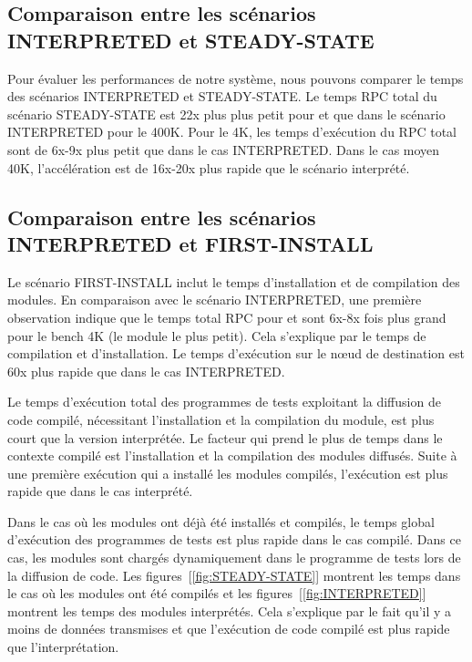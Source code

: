 \subsection{Comparaison entre les scénarios INTERPRETED et STEADY-STATE}

Pour évaluer les performances de notre système, nous pouvons comparer le temps
des scénarios INTERPRETED et STEADY-STATE. Le temps RPC total du scénario
STEADY-STATE est 22x plus plus petit pour \MMM[x86/macOS] et 
que dans le scénario INTERPRETED pour le 400K. Pour le 4K, les temps
d'exécution du RPC total sont de 6x-9x plus petit que dans le cas INTERPRETED.
Dans le cas moyen 40K, l'accélération est de 16x-20x plus rapide que le
scénario interprété.

\subsection{Comparaison entre les scénarios INTERPRETED et FIRST-INSTALL}

Le scénario FIRST-INSTALL inclut le temps d'installation et de compilation des
modules. En comparaison avec le scénario INTERPRETED, une première observation
indique que le temps total RPC pour \MMM[x86/macOS] et  sont
6x-8x fois plus grand pour le bench 4K (le module le plus petit). Cela
s'explique par le temps de compilation et d'installation.  Le temps d'exécution
sur le nœud de destination est 60x plus rapide que dans le cas INTERPRETED.


Le temps d'exécution total des programmes de tests exploitant la diffusion de
code compilé, nécessitant l'installation et la compilation du module, est plus
court que la version interprétée. Le facteur qui prend le plus de temps dans le
contexte compilé est l'installation et la compilation des modules diffusés.
Suite à une première exécution qui a installé les modules compilés, l'exécution
est plus rapide que dans le cas interprété.

Dans le cas où les modules ont déjà été installés et compilés, le temps global
d'exécution des programmes de tests est plus rapide dans le cas compilé.  Dans
ce cas, les modules sont chargés dynamiquement dans le programme de tests lors
de la diffusion de code.  Les figures~[\ref{fig:STEADY-STATE}] montrent les
temps dans le cas où les modules ont été compilés et les
figures~[\ref{fig:INTERPRETED}] montrent les temps des modules interprétés.
Cela s'explique par le fait qu'il y a moins de données transmises et que
l'exécution de code compilé est plus rapide que l'interprétation.

